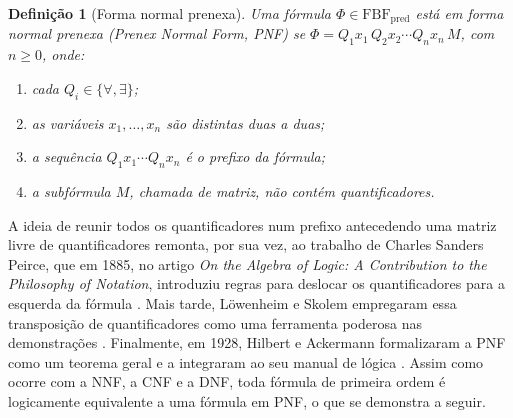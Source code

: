 \documentclass[12pt,a4paper,oneside]{report}
\theoremstyle{tituloplain}
\theoremstyle{titulodef}
\newtheorem{definicao}[teorema]{Definição}
\begin{document}
\begin{definicao}[Forma normal prenexa]\label{def:pnf}
Uma fórmula $\Phi\in\mathrm{FBF}_{\mathrm{pred}}$ está em \emph{forma normal prenexa} (\textit{Prenex Normal Form}, PNF) se $\Phi=Q_1x_1\,Q_2x_2\cdots Q_nx_n\,M$, com $n\geq 0$, onde:
\begin{enumerate}
  \item cada $Q_i\in\{\forall,\exists\}$;
  \item as variáveis $x_1,\dots,x_n$ são distintas duas a duas;
  \item a sequência $Q_1x_1\cdots Q_nx_n$ é o \emph{prefixo} da fórmula;
  \item a subfórmula $M$, chamada de \emph{matriz}, não contém quantificadores.
\end{enumerate}
\end{definicao}

A ideia de reunir todos os quantificadores num prefixo antecedendo uma matriz livre de quantificadores remonta, por sua vez, ao trabalho de Charles Sanders Peirce, que em 1885, no artigo \textit{On the Algebra of Logic: A Contribution to the Philosophy of Notation}, introduziu regras para deslocar os quantificadores para a esquerda da fórmula \cite{peirce1885}. Mais tarde, Löwenheim e Skolem empregaram essa transposição de quantificadores como uma ferramenta poderosa nas demonstrações \cite{lowenheim1915,skolem1920}. Finalmente, em 1928, Hilbert e Ackermann formalizaram a PNF como um teorema geral e a integraram ao seu manual de lógica \cite{hilbertackermann1928}. Assim como ocorre com a NNF, a CNF e a DNF, toda fórmula de primeira ordem é logicamente equivalente a uma fórmula em PNF, o que se demonstra a seguir.
\end{document}
